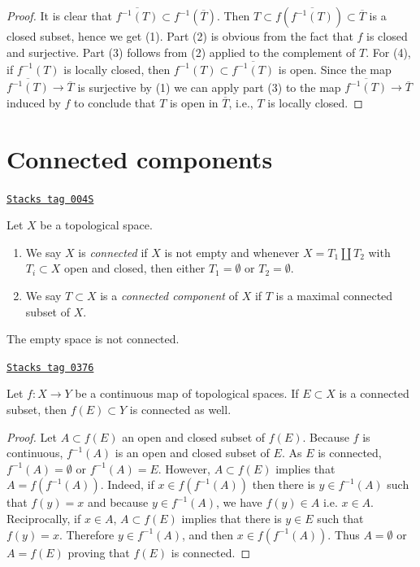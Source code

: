 \begin{proof}
It is clear that $\overline{f^{-1}(T)} \subset f^{-1}(\overline{T})$.
Then $T \subset f(\overline{f^{-1}(T)}) \subset \overline{T}$
is a closed subset, hence we get (1). Part (2) is obvious from
the fact that $f$ is closed and surjective.
Part (3) follows from (2) applied to the complement of $T$.
For (4), if $f^{-1}(T)$ is locally closed, then
$f^{-1}(T) \subset \overline{f^{-1}(T)}$ is open.
Since the map $\overline{f^{-1}(T)} \to \overline{T}$ is surjective
by (1) we can apply part (3) to the map $\overline{f^{-1}(T)} \to \overline{T}$
induced by $f$ to conclude that $T$ is open in
$\overline{T}$, i.e., $T$ is locally closed.
\end{proof}

\section{Connected components}
\label{topology-section-connected-components}
\begin{definition}
\label{topology-definition-connected-components}
\href{https://stacks.math.columbia.edu/tag/004S}{\texttt{Stacks tag 004S}}

Let $X$ be a topological space.
\begin{enumerate}
\item We say $X$ is {\it connected} if $X$ is not empty and whenever
$X = T_1 \amalg T_2$ with $T_i \subset X$ open and closed, then either
$T_1 = \emptyset$ or $T_2 = \emptyset$.
\item We say $T \subset X$ is a {\it connected component} of $X$ if
$T$ is a maximal connected subset of $X$.
\end{enumerate}
\end{definition}

The empty space is not connected.

\begin{lemma}
\label{topology-lemma-image-connected-space}
\href{https://stacks.math.columbia.edu/tag/0376}{\texttt{Stacks tag 0376}}

Let $f : X \to Y$ be a continuous map of topological spaces.
If $E \subset X$ is a connected subset, then $f(E) \subset Y$
is connected as well.
\end{lemma}

\begin{proof}
Let $A \subset f(E)$ an open and closed subset of $f(E)$. Because $f$ is
continuous, $f^{-1}(A)$ is an open and closed subset of $E$. As $E$ is
connected, $f^{-1}(A) = \emptyset$ or $f^{-1}(A) = E$. However, $A\subset f(E)$
implies that $A = f(f^{-1}(A))$. Indeed, if $x\in f(f^{-1}(A))$ then there is
$y\in f^{-1}(A)$ such that $f(y) = x$ and because $y\in f^{-1}(A)$, we have
$f(y) \in A$ i.e. $x\in A$. Reciprocally, if $x\in A$, $A\subset f(E)$ implies
that there is $y\in E$ such that $f(y) = x$. Therefore $y\in f^{-1}(A)$, and
then $x\in f(f^{-1}(A))$. Thus $A = \emptyset$ or $A = f(E)$ proving that
$f(E)$ is connected.
\end{proof}

